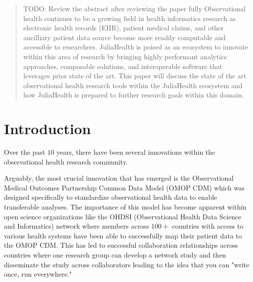 \documentclass{juliacon}
\begin{document}


\maketitle

\begin{abstract}

TODO: Review the abstract after reviewing the paper fully
Observational health continues to be a growing field in health informatics research as electronic health records (EHR), patient medical claims, and other ancilliary patient data source become more readily computable and accessible to researchers.
JuliaHealth is poised as an ecosystem to innovate within this area of research by bringing highly performant analytics approaches, composable solutions, and interoperable software that leverages prior state of the art. 
This paper will discuss the state of the art observational health research tools within the JuliaHealth ecosystem and how JuliaHealth is prepared to further research goals within this domain.

\end{abstract}

\section{Introduction}

Over the past $10$ years, there have been several innovations within the observational health research community.

Arguably, the most crucial innovation that has emerged is the Observational Medical Outcomes Partnership Common Data Model (OMOP CDM) which was designed specifically to standardize observational health data to enable transferable analyses.
The importance of this model has become apparent within open science organizations like the OHDSI (Observational Health Data Science and Informatics) network where members across $100+$ countries with access to various health systems have been able to successfully map their patient data to the OMOP CDM.
This has led to successful collaboration relationships across countries where one research group can develop a network study and then disseminate the study across collaborators leading to the idea that you can "write once, run everywhere."
\end{document}
